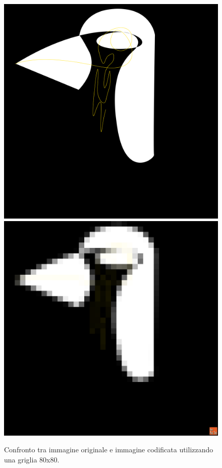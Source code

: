 \begin{figure}[htb] \centering
\includegraphics[scale=0.03]{Pictures/in ricordo del pinguino cameriere.png}
\qquad\qquad
\includegraphics[scale=0.03]{Pictures/canvas80x80.png}
\caption{Confronto tra immagine originale e immagine codificata utilizzando una griglia 80x80.}\label{fig:figura}
\end{figure}

